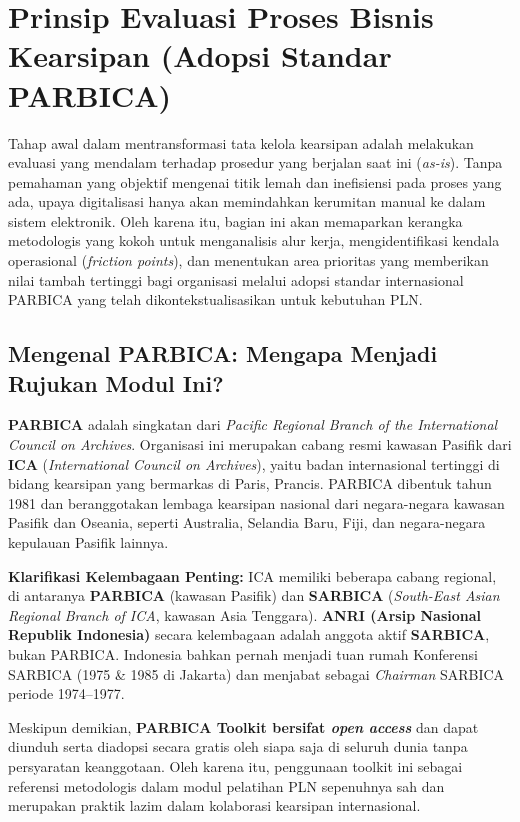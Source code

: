 \documentclass[12pt,a4paper]{report}
\begin{document}
\section{Prinsip Evaluasi Proses Bisnis Kearsipan (Adopsi Standar PARBICA)}
Tahap awal dalam mentransformasi tata kelola kearsipan adalah melakukan evaluasi yang mendalam terhadap prosedur yang berjalan saat ini (\textit{as-is}). Tanpa pemahaman yang objektif mengenai titik lemah dan inefisiensi pada proses yang ada, upaya digitalisasi hanya akan memindahkan kerumitan manual ke dalam sistem elektronik. Oleh karena itu, bagian ini akan memaparkan kerangka metodologis yang kokoh untuk menganalisis alur kerja, mengidentifikasi kendala operasional (\textit{friction points}), dan menentukan area prioritas yang memberikan nilai tambah tertinggi bagi organisasi melalui adopsi standar internasional PARBICA yang telah dikontekstualisasikan untuk kebutuhan PLN.


\subsection{Mengenal PARBICA: Mengapa Menjadi Rujukan Modul Ini?}
\textbf{PARBICA} adalah singkatan dari \textit{Pacific Regional Branch of the International Council on Archives}. Organisasi ini merupakan cabang resmi kawasan Pasifik dari \textbf{ICA} (\textit{International Council on Archives}), yaitu badan internasional tertinggi di bidang kearsipan yang bermarkas di Paris, Prancis. PARBICA dibentuk tahun 1981 dan beranggotakan lembaga kearsipan nasional dari negara-negara kawasan Pasifik dan Oseania, seperti Australia, Selandia Baru, Fiji, dan negara-negara kepulauan Pasifik lainnya.

\begin{warnbox}
\textbf{Klarifikasi Kelembagaan Penting:} ICA memiliki beberapa cabang regional, di antaranya \textbf{PARBICA} (kawasan Pasifik) dan \textbf{SARBICA} (\textit{South-East Asian Regional Branch of ICA}, kawasan Asia Tenggara). \textbf{ANRI (Arsip Nasional Republik Indonesia)} secara kelembagaan adalah anggota aktif \textbf{SARBICA}, bukan PARBICA. Indonesia bahkan pernah menjadi tuan rumah Konferensi SARBICA (1975 \& 1985 di Jakarta) dan menjabat sebagai \textit{Chairman} SARBICA periode 1974--1977.

Meskipun demikian, \textbf{PARBICA Toolkit bersifat \textit{open access}} dan dapat diunduh serta diadopsi secara gratis oleh siapa saja di seluruh dunia tanpa persyaratan keanggotaan. Oleh karena itu, penggunaan toolkit ini sebagai referensi metodologis dalam modul pelatihan PLN sepenuhnya sah dan merupakan praktik lazim dalam kolaborasi kearsipan internasional.
\end{warnbox}
\end{document}
